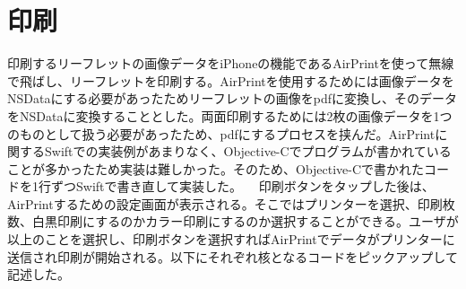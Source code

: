 \section{印刷}
印刷するリーフレットの画像データをiPhoneの機能であるAirPrintを使って無線で飛ばし、リーフレットを印刷する。AirPrintを使用するためには画像データをNSDataにする必要があったためリーフレットの画像をpdfに変換し、そのデータをNSDataに変換することとした。両面印刷するためには2枚の画像データを1つのものとして扱う必要があったため、pdfにするプロセスを挟んだ。AirPrintに関するSwiftでの実装例があまりなく、Objective-Cでプログラムが書かれていることが多かったため実装は難しかった。そのため、Objective-Cで書かれたコードを1行ずつSwiftで書き直して実装した。
　印刷ボタンをタップした後は、AirPrintするための設定画面が表示される。そこではプリンターを選択、印刷枚数、白黒印刷にするのかカラー印刷にするのか選択することができる。ユーザが以上のことを選択し、印刷ボタンを選択すればAirPrintでデータがプリンターに送信され印刷が開始される。以下にそれぞれ核となるコードをピックアップして記述した。
